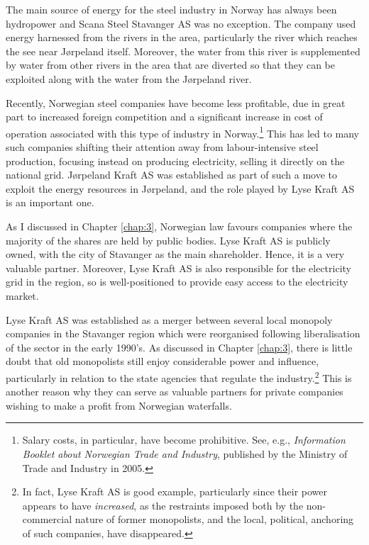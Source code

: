 The main source of energy for the steel industry in Norway has always been hydropower and Scana Steel Stavanger AS was no exception. The company used energy harnessed from the rivers in the area, particularly the river which reaches the see near Jørpeland itself. Moreover, the water from this river is supplemented by water from other rivers in the area that are diverted so that they can be exploited along with the water from the Jørpeland river.

Recently, Norwegian steel companies have become less profitable, due in great part to increased foreign competition and a significant increase in cost of operation associated with this type of industry in Norway.\footnote{Salary costs, in particular, have become prohibitive. See, e.g., \emph{Information Booklet about Norwegian Trade and Industry}, published by the Ministry of Trade and Industry in 2005.} This has led to many such companies shifting their attention away from labour-intensive steel production, focusing instead on producing electricity, selling it directly on the national grid. Jørpeland Kraft AS was established as part of such a move to exploit the energy resources in Jørpeland, and the role played by Lyse Kraft AS is an important one.

As I discussed in Chapter \ref{chap:3}, Norwegian law favours companies where the majority of the shares are held by public bodies. Lyse Kraft AS is publicly owned, with the city of Stavanger as the main shareholder. Hence, it is a very valuable partner. Moreover, Lyse Kraft AS  is also responsible for the electricity grid in the region, so is well-positioned to provide easy access to the electricity market. 

Lyse Kraft AS was established as a merger between several local monopoly companies in the Stavanger region which were reorganised following liberalisation of the sector in the early 1990's. As discussed in Chapter \ref{chap:3}, there is little doubt that old monopolists still enjoy considerable power and influence, particularly in relation to the state agencies that regulate the industry.\footnote{In fact, Lyse Kraft AS is good example, particularly since their power appears to have \emph{increased}, as the restraints imposed both by the non-commercial nature of former monopolists, and the local, political, anchoring of such companies, have disappeared.} This is another reason why they can serve as valuable partners for private companies wishing to make a profit from Norwegian waterfalls.

